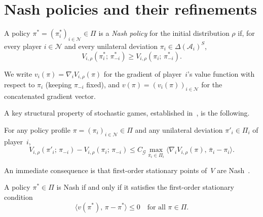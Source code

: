 \documentclass[a4paper,oneside,11pt]{report}
\newcommand{\calN}{\mathcal{N}}
\newcommand{\calA}{\mathcal{A}}
\newcommand{\calG}{\mathcal{G}}
\newcommand{\ip}[2]{\langle #1,\, #2 \rangle}
\numberwithin{theorem}{chapter}
\numberwithin{equation}{chapter}
\begin{document}
\section{Nash policies and their refinements}
\label{sec:nash}

\begin{definition}
  \label{def:nash}
  A policy $\pi^* = (\pi^*_i)_{i \in \calN} \in \Pi$ is a \emph{Nash
    policy} for the initial distribution $\rho$ if, for every player
  $i \in \calN$ and every unilateral deviation
  $\pi_i \in \Delta(\calA_i)^S$,
  \begin{equation}
    \label{eq:NE}
    V_{i,\rho}(\pi^*_i;\, \pi^*_{-i}) \ge
    V_{i,\rho}(\pi_i;\, \pi^*_{-i}).
    \tag{NE}
  \end{equation}
\end{definition}

We write $v_i(\pi) = \nabla_i V_{i,\rho}(\pi)$ for the gradient of
player~$i$'s value function with respect to $\pi_i$ (keeping
$\pi_{-i}$ fixed), and $v(\pi) = (v_i(\pi))_{i \in \calN}$ for the
concatenated gradient vector.

A key structural property of stochastic games, established
in~\cite{giannou2022, daskalakis2022, zhang2022}, is the following.

\begin{lemma}
  \label{lem:GDP}
  For any policy profile $\pi = (\pi_i)_{i \in \calN} \in \Pi$ and any
  unilateral deviation $\pi'_i \in \Pi_i$ of player~$i$,
  \begin{equation}
    \label{eq:GDP}
    V_{i,\rho}(\pi'_i;\, \pi_{-i}) - V_{i,\rho}(\pi_i;\, \pi_{-i})
    \le C_\calG \max_{\bar\pi_i \in \Pi_i}
    \ip{\nabla_i V_{i,\rho}(\pi)}{\bar\pi_i - \pi_i}.
    \tag{GDP}
  \end{equation}
\end{lemma}

An immediate consequence is that first-order stationary points of~$V$
are Nash~\cite[Lemma~3]{giannou2022}.

\begin{lemma}
  \label{lem:FOS-Nash}
  A policy $\pi^* \in \Pi$ is Nash if and only if it satisfies the
  first-order stationary condition
  \begin{equation}
    \label{eq:FOS}
    \ip{v(\pi^*)}{\pi - \pi^*} \le 0
    \quad \text{for all } \pi \in \Pi.
    \tag{FOS}
  \end{equation}
\end{lemma}
\end{document}
